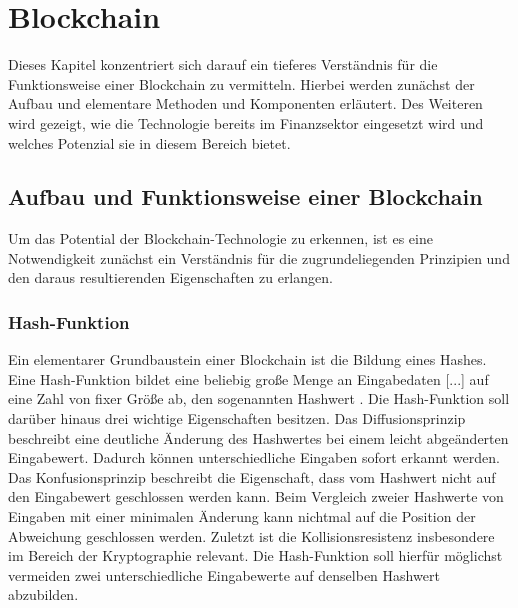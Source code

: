 \section{Blockchain}
Dieses Kapitel konzentriert sich darauf ein tieferes Verständnis für die Funktionsweise einer Blockchain
zu vermitteln. Hierbei werden zunächst der Aufbau und elementare Methoden und Komponenten erläutert.
Des Weiteren wird gezeigt, wie die Technologie bereits im Finanzsektor eingesetzt wird und welches Potenzial
sie in diesem Bereich bietet.


\subsection{Aufbau und Funktionsweise einer Blockchain}
Um das Potential der Blockchain-Technologie zu erkennen, ist es eine Notwendigkeit zunächst ein Verständnis 
für die zugrundeliegenden Prinzipien und den daraus resultierenden Eigenschaften zu erlangen.





\subsubsection{Hash-Funktion}
Ein elementarer Grundbaustein einer Blockchain ist die Bildung eines Hashes.
\glqq Eine Hash-Funktion bildet eine beliebig große Menge an Eingabedaten [...] auf eine Zahl von 
fixer Größe ab, den sogenannten Hashwert\grqq{} \cite[p.~6]{fill2020blockchain}.
Die Hash-Funktion soll darüber hinaus drei wichtige Eigenschaften besitzen.
Das Diffusionsprinzip beschreibt eine deutliche Änderung des Hashwertes bei einem leicht
abgeänderten Eingabewert. Dadurch können unterschiedliche Eingaben sofort erkannt werden.
Das Konfusionsprinzip beschreibt die Eigenschaft, dass vom Hashwert nicht auf den Eingabewert
geschlossen werden kann. Beim Vergleich zweier Hashwerte von Eingaben mit einer minimalen
Änderung kann nichtmal auf die Position der Abweichung geschlossen werden.
Zuletzt ist die Kollisionsresistenz insbesondere im Bereich der Kryptographie relevant.
Die Hash-Funktion soll hierfür möglichst vermeiden zwei unterschiedliche Eingabewerte
auf denselben Hashwert abzubilden.
\cite[p.~6ff]{fill2020blockchain} 

